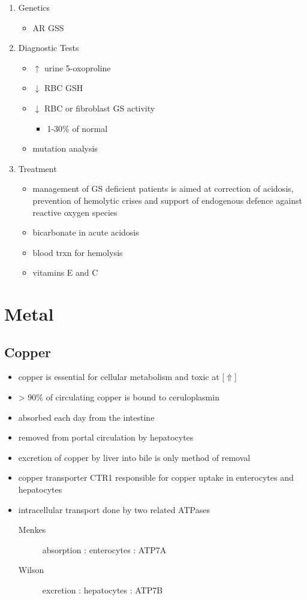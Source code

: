 \documentclass[12pt]{scrartcl}
\begin{document}
\begin{enumerate}
\item Genetics
\label{sec:orgb495ad1}
\begin{itemize}
\item AR GSS
\end{itemize}

\item Diagnostic Tests
\label{sec:org61bdfc5}
\begin{itemize}
\item \(\uparrow\) urine 5-oxoproline
\item \(\downarrow\) RBC GSH
\item \(\downarrow\) RBC or fibroblast GS activity
\begin{itemize}
\item 1-30\% of normal
\end{itemize}
\item mutation analysis
\end{itemize}

\item Treatment
\label{sec:orge8e7502}
\begin{itemize}
\item management of GS deficient patients is aimed at correction of
acidosis, prevention of hemolytic crises and support of endogenous
defence against reactive oxygen species
\item bicarbonate in acute acidosis
\item blood trxn for hemolysis
\item vitamins E and C
\end{itemize}
\end{enumerate}
\section{Metal}
\label{sec:orgd1d1f1f}
\subsection{Copper}
\label{sec:orgbcd68e7}
\begin{itemize}
\item copper is essential for cellular metabolism and toxic at [\(\Uparrow\)]
\item \textgreater{} 90\% of circulating copper is bound to ceruloplasmin
\item absorbed each day from the intestine
\item removed from portal circulation by hepatocytes
\item excretion of copper by liver into bile is only method of removal
\item copper transporter CTR1 responsible for copper uptake in enterocytes and hepatocytes
\item intracellular transport done by two related ATPases
\begin{description}
\item[{Menkes}] absorption : enterocytes : ATP7A
\item[{Wilson}] excretion : hepatocytes : ATP7B
\end{description}
\end{itemize}
\end{document}
